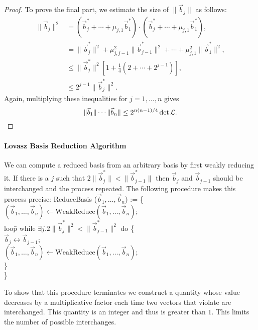 \begin{proof}
To prove the final part, we estimate the size of $\|\vec{b}_j\|$ as follows:
\[
\begin{aligned}
 \|\vec{b}_j\|^2 
   & = (\vec{b}^{\ast}_j + \cdots + \mu_{j,1} \vec{b}^{\ast}_{1})
     \cdot
       (\vec{b}^{\ast}_j + \cdots + \mu_{j,1} \vec{b}^{\ast}_{1}), \\
   & = \|\vec{b}^{\ast}_j\|^2 + \mu_{j,j-1}^2 \|\vec{b}^{\ast}_{j-1}\|^2 +
       \cdots + \mu_{j,1}^2 \|\vec{b}^{\ast}_{1}\|^2, \\[3pt]
   & \displaystyle
     \le \|\vec{b}^{\ast}_j\|^2 \left[ 1 + \frac{1}{4}(2 + \cdots +
2^{j-1})\right], \\
 & \le 2^{j-1} \|\vec{b}^{\ast}_j\|^2.
\end{aligned}
\]
Again, multiplying these inequalities for $j = 1, \ldots, n$ gives
\[
\|\vec{b}_1\| \cdots \|\vec{b}_n\| \le 2^{n(n-1)/4} \det {\cal L}.
\]
\end{proof}

\paragraph{Lovasz Basis Reduction Algorithm}

We can compute a reduced basis from an arbitrary basis by first weakly
reducing it.  If there is a $j$ such that $2 \|\vec{b}^{\ast}_j\| <
\|\vec{b}^{\ast}_{j-1}\|$ then $\vec{b}_j$ and $\vec{b}_{j-1}$ should
be interchanged and the process repeated.  The following procedure
makes this process precise:
\begindsacode
ReduceBasis ($\vec{b}_1, \ldots, \vec{b}_n$) := \{ \\
\> $(\vec{b}_1, \ldots, \vec{b}_n) \leftarrow
  \mbox{WeakReduce}(\vec{b}_1, \ldots, \vec{b}_n)$; \\
\> loo\=p while $\exists j . 2 \|\vec{b}^{\ast}_j\|^2 <
\|\vec{b}^{\ast}_{j-1}\|^2$ do \{ \\
\>\> $\vec{b}_j \leftrightarrow \vec{b}_{j-1}$; \\
\>\> $(\vec{b}_1, \ldots, \vec{b}_n) \leftarrow
  \mbox{WeakReduce}(\vec{b}_1, \ldots, \vec{b}_n)$; \\
\>\> \} \\
\> \} 
\enddsacode

To show that this procedure terminates we construct a quantity whose
value decreases by a multiplicative factor each time two vectors that
violate  are interchanged.  This quantity
is an integer and thus is greater than $1$.  This limits the number of
possible interchanges.

